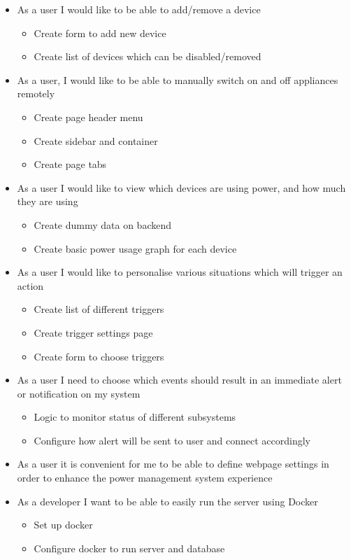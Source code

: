 \documentclass[10pt,twocolumn]{witseiepaper}
\begin{document}
	\begin{itemize}
		\item As a user I would like to be able to add/remove a device
		\begin{itemize}
			\item Create form to add new device
			\item Create list of devices which can be disabled/removed
		\end{itemize}
		\item As a user, I would like to be able to manually switch on and off appliances remotely
		\begin{itemize}
			\item Create page header menu
			\item Create sidebar and container
			\item Create page tabs
		\end{itemize}
		\item As a user I would like to view which devices are using power, and how much they are using
		\begin{itemize}
			\item Create dummy data on backend
			\item Create basic power usage graph for each device
		\end{itemize}
		\item As a user I would like to personalise various situations which will trigger an action
		\begin{itemize}
			\item Create list of different triggers 
			\item Create trigger settings page 
			\item Create form to choose triggers
		\end{itemize}
		\item As a user I need to choose which events should result in an immediate alert or notification on my system
		\begin{itemize}
			\item Logic to monitor status of different subsystems
			\item Configure how alert will be sent to user and connect accordingly
		\end{itemize}
		\item As a user it is convenient for me to be able to define webpage settings in order to enhance the power management system experience
		\item As a developer I want to be able to easily run the server using Docker
		\begin{itemize}
			\item Set up docker
			\item Configure docker to run server and database
		\end{itemize}
	\end{itemize}
\end{document}
